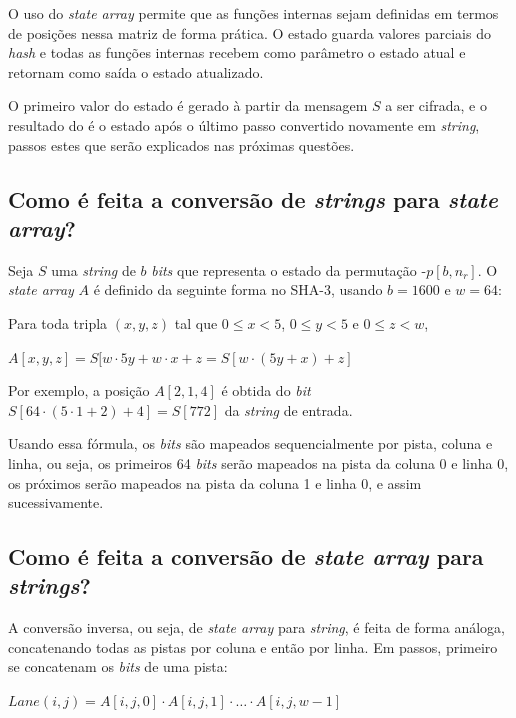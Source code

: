 O uso do \textit{state array} permite que as funções internas sejam definidas
em termos de posições nessa matriz de forma prática. O estado guarda valores
parciais do \textit{hash} e todas as funções internas recebem como parâmetro
o estado atual e retornam como saída o estado atualizado.

O primeiro valor do estado é gerado à partir da mensagem $S$ a ser cifrada, e o
resultado do  é o estado após o último passo convertido novamente em
\textit{string}, passos estes que serão explicados nas próximas questões.

\subsection{Como é feita a conversão de \textit{strings} para
    \textit{state array}?}

Seja $S$ uma \textit{string} de $b$ \textit{bits} que representa o estado da
permutação \Keccak-$p[b, n_{r}]$. O \textit{state array} $A$ é definido da
seguinte forma no SHA-3, usando $b = 1600$ e $w = 64$:

Para toda tripla $(x, y, z)$ tal que $0 \leq x < 5$, $0 \leq y < 5$ e
$0 \leq z < w$,

\begin{center}
    $A[x, y, z] = S[w \cdot 5y + w \cdot x + z = S[w \cdot (5y+x) + z]$
\end{center}

Por exemplo, a posição $A[2, 1, 4]$ é obtida do \textit{bit}
$S[64 \cdot (5 \cdot 1 + 2) + 4] = S[772]$ da \textit{string} de entrada.

Usando essa fórmula, os \textit{bits} são mapeados sequencialmente por pista,
coluna e linha, ou seja, os primeiros 64 \textit{bits} serão mapeados na pista
da coluna 0 e linha 0, os próximos serão mapeados na pista da coluna 1 e linha
0, e assim sucessivamente.

\subsection{Como é feita a conversão de \textit{state array} para
    \textit{strings}?}

A conversão inversa, ou seja, de \textit{state array} para \textit{string}, é
feita de forma análoga, concatenando todas as pistas por coluna e então por
linha. Em passos, primeiro se concatenam os \textit{bits} de uma pista:

$Lane(i, j) = A[i, j, 0] \cdot A[i, j, 1] \cdot \ldots \cdot A[i, j, w-1]$

